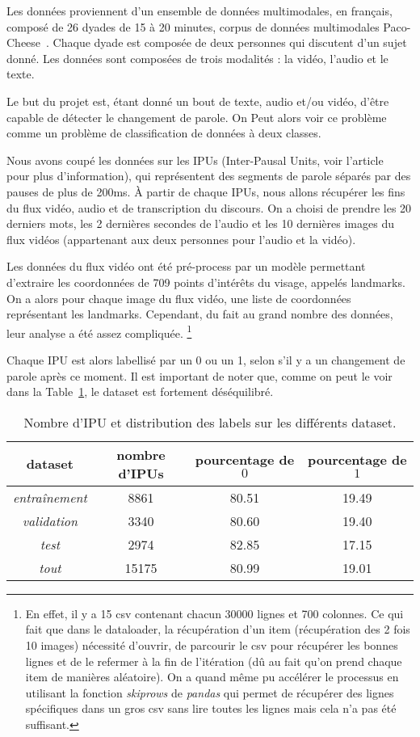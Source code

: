 Les données proviennent d'un ensemble de données multimodales, en français, composé de 26 dyades de 15 à 20 minutes, 
corpus de données multimodales Paco-Cheese~\cite{paperswithcode-paco}.
Chaque dyade est composée de deux personnes qui discutent d'un sujet donné. Les données sont composées de trois modalités : la vidéo,
l'audio et le texte.

Le but du projet est, étant donné un bout de texte, audio et/ou vidéo, d'être capable de détecter le changement de parole.
On Peut alors voir ce problème comme un problème de classification de données à deux classes.

Nous avons coupé les données sur les IPUs (Inter-Pausal Units, voir l'article~\cite{turn-taking} pour plus d'information),
qui représentent des segments de parole séparés par des pauses
de plus de 200ms. À partir de chaque IPUs, nous allons récupérer les fins du flux vidéo, audio et de transcription du discours.
On a choisi de prendre les 20 derniers mots, les 2 dernières secondes de l'audio et les 10 dernières images du flux vidéos
(appartenant aux deux personnes pour l'audio et la vidéo).

Les données du flux vidéo ont été pré-process par un modèle permettant d'extraire les coordonnées de 709 points d'intérêts du 
visage, appelés landmarks. On a alors pour chaque image du flux vidéo, une liste de coordonnées représentant les landmarks. Cependant, 
du fait au grand nombre des données, leur analyse a été assez compliquée.
\footnote{En effet, il y a 15 csv contenant chacun 30000 lignes et 700 colonnes. Ce qui fait que dans le dataloader, 
la récupération d'un item (récupération des 2 fois 10 images) nécessité d'ouvrir, de parcourir le csv pour récupérer les bonnes lignes et
de le refermer à la fin de l'itération (dû au fait qu'on prend chaque item de manières aléatoire). On a quand même pu accélérer le processus
en utilisant la fonction \textit{skiprows} de \textit{pandas} qui permet de récupérer des lignes spécifiques dans un gros csv sans lire 
toutes les lignes mais cela n'a pas été suffisant.}

Chaque IPU est alors labellisé par un 0 ou un 1, selon s'il y a un changement de parole après ce moment. Il est important de noter que, 
comme on peut le voir dans la Table~\ref{tab: label distribution}, le dataset est fortement déséquilibré.

\begin{table}[H]
    \centering
    \begin{tabular}{|c|c|c|c|}
        \hline
        dataset & nombre d'IPUs & pourcentage de $0$ & pourcentage de $1$ \\
        \hline
        \textit{entraînement} & 8861 & 80.51 & 19.49\\
        \hline
        \textit{validation} & 3340 & 80.60 & 19.40\\
        \hline
        \textit{test} & 2974 & 82.85 & 17.15\\
        \hline
        \textit{tout} & 15175 & 80.99 & 19.01 \\
        \hline
    \end{tabular}
    \caption{Nombre d'IPU et distribution des labels sur les différents dataset.}
    \label{tab: label distribution}
\end{table}